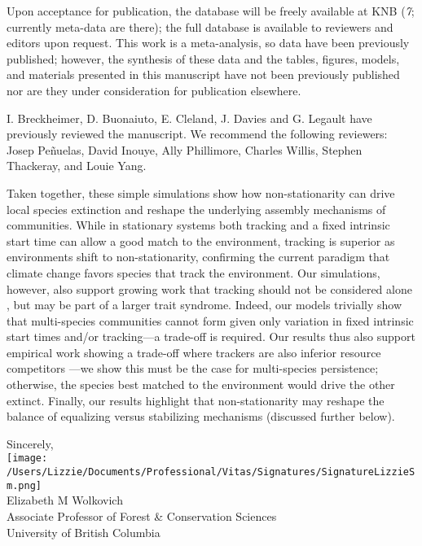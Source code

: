 \documentclass[12pt,a4paper]{letter}
\begin{document}
\begin{letter}{}
 Upon acceptance for publication, the database will be freely available at KNB (\emph{7}; currently meta-data are there); the full database is available to reviewers and editors upon request. This work is a meta-analysis, so data have been previously published; however, the synthesis of these data and the tables, figures, models, and materials presented in this manuscript have not been previously published nor are they under consideration for publication elsewhere.

I. Breckheimer, D. Buonaiuto, E. Cleland, J. Davies and G. Legault have previously reviewed the manuscript. We recommend the following reviewers: Josep Pe\~nuelas, David Inouye, Ally Phillimore, Charles Willis, Stephen Thackeray, and Louie Yang. 

Taken together, these simple simulations show how non-stationarity can drive local species extinction and reshape the underlying assembly mechanisms of communities. While in stationary systems both tracking and a fixed intrinsic start time can allow a good match to the environment, tracking is superior as environments shift to non-stationarity, confirming the current paradigm that climate change favors species that track the environment. Our simulations, however, also support growing work that tracking should not be considered alone \citep{Diamond:2011nx,Dorji2013,Ishioka2013,kharouba2014,du2017}, but may be part of a larger trait syndrome. Indeed, our models trivially show that multi-species communities cannot form given only variation in fixed intrinsic start times and/or tracking---a trade-off is required. Our results thus also support empirical work showing a trade-off where trackers are also inferior resource competitors \citep{lasky2016,Zhu2016BioLetters}---we show this must be the case for multi-species persistence; otherwise, the species best matched to the environment would drive the other extinct. Finally, our results highlight that non-stationarity may reshape the balance of equalizing versus stabilizing mechanisms (discussed further below). 



Sincerely,\\

\texttt{[image: /Users/Lizzie/Documents/Professional/Vitas/Signatures/SignatureLizzieSm.png]} \\

Elizabeth M Wolkovich\\
Associate Professor of Forest \& Conservation Sciences\\ 
University of British Columbia
\end{letter}
\end{document}
